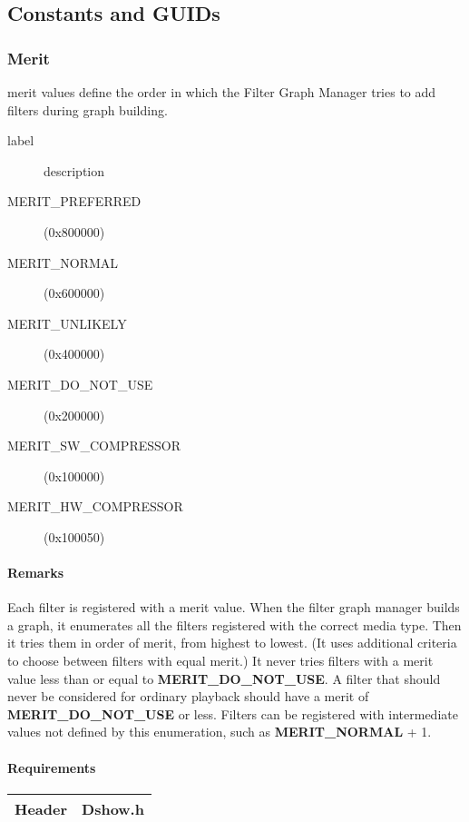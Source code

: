 \subsection{Constants and GUIDs}


\subsubsection{Merit}
\gls{merit} values define the order in which the Filter Graph Manager tries to add filters during graph building.

\begin{description}
	\item[label] description
	\item [MERIT\_PREFERRED] (0x800000)
	\item [MERIT\_NORMAL] (0x600000)
	\item [MERIT\_UNLIKELY] (0x400000)
	\item [MERIT\_DO\_NOT\_USE] (0x200000)
	\item [MERIT\_SW\_COMPRESSOR] (0x100000)
	\item [MERIT\_HW\_COMPRESSOR] (0x100050)
\end{description}

\paragraph{Remarks}
Each filter is registered with a merit value. When the filter graph manager builds a graph, it enumerates all the filters registered with the correct media type. Then it tries them in order of merit, from highest to lowest. (It uses additional criteria to choose between filters with equal merit.) It never tries filters with a merit value less than or equal to \textbf{MERIT\_DO\_NOT\_USE}.
A filter that should never be considered for ordinary playback should have a merit of \textbf{MERIT\_DO\_NOT\_USE} or less. Filters can be registered with intermediate values not defined by this enumeration, such as \textbf{MERIT\_NORMAL} + 1.

\paragraph{Requirements}

\begin{tabular}[h]{|l|l|}
	\hline
	\textbf{Header} & Dshow.h\\
	\hline
\end{tabular}

	